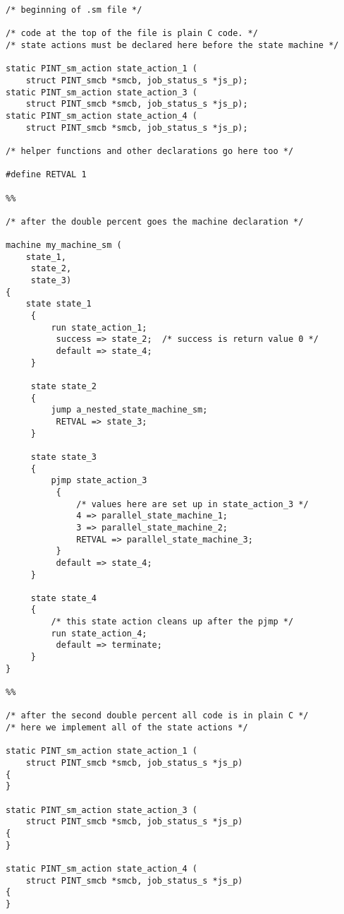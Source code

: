 \begin{verbatim}
/* beginning of .sm file */

/* code at the top of the file is plain C code. */
/* state actions must be declared here before the state machine */

static PINT_sm_action state_action_1 (
    struct PINT_smcb *smcb, job_status_s *js_p);
static PINT_sm_action state_action_3 (
    struct PINT_smcb *smcb, job_status_s *js_p);
static PINT_sm_action state_action_4 (
    struct PINT_smcb *smcb, job_status_s *js_p);

/* helper functions and other declarations go here too */

#define RETVAL 1

%%

/* after the double percent goes the machine declaration */

machine my_machine_sm (
    state_1,
	 state_2,
	 state_3)
{
    state state_1
	 {
	     run state_action_1;
		  success => state_2;  /* success is return value 0 */
		  default => state_4;
	 }

	 state state_2
	 {
	     jump a_nested_state_machine_sm;
		  RETVAL => state_3;
	 }

	 state state_3
	 {
	     pjmp state_action_3
		  {
		      /* values here are set up in state_action_3 */
		      4 => parallel_state_machine_1;
		      3 => parallel_state_machine_2;
		      RETVAL => parallel_state_machine_3;
		  }
		  default => state_4;
	 }

	 state state_4
	 {
	     /* this state action cleans up after the pjmp */
	     run state_action_4;
		  default => terminate;
	 }
}

%%

/* after the second double percent all code is in plain C */
/* here we implement all of the state actions */

static PINT_sm_action state_action_1 (
    struct PINT_smcb *smcb, job_status_s *js_p)
{
}

static PINT_sm_action state_action_3 (
    struct PINT_smcb *smcb, job_status_s *js_p)
{
}

static PINT_sm_action state_action_4 (
    struct PINT_smcb *smcb, job_status_s *js_p)
{
}

\end{verbatim}


